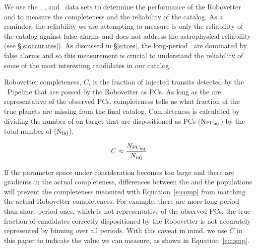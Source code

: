 %

\newcommand{\opsfp}{N$_{\rm FP_{\rm obs}}$}
\newcommand{\opspc}{N$_{\rm PC_{\rm obs}}$}
\newcommand{\opsN}{N$_{\rm obs}$}
\newcommand{\trueopspc}{T$_{\rm PC_{\rm obs}}$}
\newcommand{\missedfp}{T$_{\rm FP_{\rm obs}}$ - N$_{\rm FP_{\rm obs}}$}
\newcommand{\invfp}{N$_{\rm FP_{\rm inv}}$}
\newcommand{\invpc}{N$_{\rm PC_{\rm inv}}$}
\newcommand{\invN}{N$_{\rm inv}$}
\newcommand{\simfp}{N$_{\rm FP_{\rm sim}}$}
\newcommand{\simpc}{N$_{\rm PC_{\rm sim}}$}
\newcommand{\simN}{N$_{\rm sim}$}
\newcommand{\sfatce}{sfaTCE}


We use the \injtce, \scrtce, and \invtce\ data sets to determine the performance of the Robovetter and to measure the completeness and the reliability of the catalog. As a reminder, the reliability we are attempting to measure is only the reliability of the catalog against false alarms and does not address the astrophysical reliability (see \S\ref{s:occurates}). As discussed in \S\ref{s:tces}, the long-period \opstces\ are dominated by false alarms and so this measurement is crucial to understand the reliability of some of the most interesting candidates in our catalog.


Robovetter completeness, $C$, is the fraction of injected transits detected by the \Kepler\ Pipeline that are passed by the Robovetter as PCs.  As long as the  are representative of the observed PCs, completeness tells us what fraction of the true planets are missing from the final catalog.  Completeness is calculated by dividing the number of on-target  that are dispositioned as PCs (N$_{\rm PC_{\rm inj}}$) by the total number of  (N$_{\rm inj}$).

\begin{equation}
C \approx \frac{N_{\rm PC_{\rm inj}}}{N_{\rm inj}}
\label{e:comp}
\end{equation}

\noindent If the parameter space under consideration becomes too large and there are gradients in the actual completeness, differences between the \injtce and the \opstce{} populations will prevent the completeness measured with Equation~\ref{e:comp} from matching the actual Robovetter completeness. For example, there are more long-period  than short-period ones, which is not representative of the observed PCs, the true fraction of candidates correctly dispositioned by the Robovetter is not accurately represented by binning over all periods. With this caveat in mind, we use $C$ in this paper to indicate the value we can measure, as shown in Equation~\ref{e:comp}.

